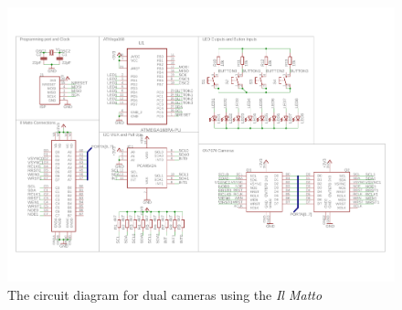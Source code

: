 \begin{figure}
\centering
\includegraphics[width=\textheight-4cm,height=\textwidth,keepaspectratio]{Figures/IlMattoCamera_CircuitDiagram.pdf} 
\caption{The circuit diagram for dual cameras using the \textit{Il Matto}}
\label{sch:DualCam_Schematic}
\end{figure}
\clearpage


